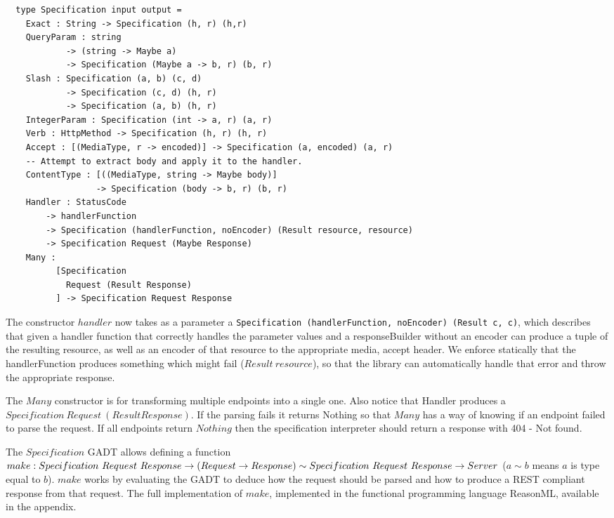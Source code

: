 \begin{lstlisting}
  type Specification input output =
    Exact : String -> Specification (h, r) (h,r)
    QueryParam : string 
            -> (string -> Maybe a) 
            -> Specification (Maybe a -> b, r) (b, r)
    Slash : Specification (a, b) (c, d) 
            -> Specification (c, d) (h, r) 
            -> Specification (a, b) (h, r) 
    IntegerParam : Specification (int -> a, r) (a, r)
    Verb : HttpMethod -> Specification (h, r) (h, r)
    Accept : [(MediaType, r -> encoded)] -> Specification (a, encoded) (a, r)
    -- Attempt to extract body and apply it to the handler.
    ContentType : [((MediaType, string -> Maybe body)]
                  -> Specification (body -> b, r) (b, r)
    Handler : StatusCode 
        -> handlerFunction 
        -> Specification (handlerFunction, noEncoder) (Result resource, resource)
        -> Specification Request (Maybe Response)
    Many :
          [Specification 
            Request (Result Response)
          ] -> Specification Request Response
\end{lstlisting}

The constructor $handler$ now takes as a parameter a \texttt{Specification
(handlerFunction, noEncoder) (Result c, c)}, which describes that given a
handler function that correctly handles the parameter values and a
responseBuilder without an encoder can produce a tuple of the resulting
resource, as well as an encoder of that resource to the appropriate media,
accept header. We enforce statically that the handlerFunction produces something
which might fail ($Result\ resource$), so that the library can automatically
handle that error and throw the appropriate response. 

The $Many$ constructor is for transforming multiple endpoints into a single one.
Also notice that Handler produces a $Specification\ Request\ (Result Response)$.
If the parsing fails it returns Nothing so that $Many$ has a way of knowing if
an endpoint failed to parse the request. If all endpoints return $Nothing$ then
the specification interpreter should return a response with  404 - Not found.

The $Specification$ GADT allows defining a function\\ $make : Specification\
Request\ Response \rightarrow (Request \rightarrow Response) \sim\\
Specification\ Request\ Response \rightarrow Server$ ($a\sim b$ means $a$ is
type equal to $b$).  $make$ works by evaluating the GADT to deduce how the
request should be parsed and how to produce a REST compliant response from that
request.  The full implementation of $make$, implemented in the functional
programming language ReasonML, available in the appendix.

